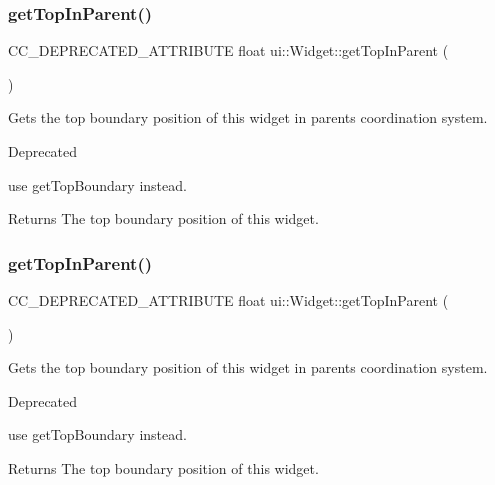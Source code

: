 \subsubsection{\texorpdfstring{get\+Top\+In\+Parent()}{getTopInParent()}\hspace{0.1cm}{\footnotesize\ttfamily [1/2]}}
{\footnotesize\ttfamily C\+C\+\_\+\+D\+E\+P\+R\+E\+C\+A\+T\+E\+D\+\_\+\+A\+T\+T\+R\+I\+B\+U\+TE float ui\+::\+Widget\+::get\+Top\+In\+Parent (\begin{DoxyParamCaption}{ }\end{DoxyParamCaption})\hspace{0.3cm}{\ttfamily [inline]}}

Gets the top boundary position of this widget in parent\textquotesingle{}s coordination system. \begin{DoxyRefDesc}{Deprecated}
\item[\hyperlink{deprecated__deprecated000171}{Deprecated}]use {\ttfamily get\+Top\+Boundary} instead. \end{DoxyRefDesc}
\begin{DoxyReturn}{Returns}
The top boundary position of this widget. 
\end{DoxyReturn}
\mbox{\label{classui_1_1Widget_a3a4efd935d1f5e58f1ee1d56dd493607}} 
\subsubsection{\texorpdfstring{get\+Top\+In\+Parent()}{getTopInParent()}\hspace{0.1cm}{\footnotesize\ttfamily [2/2]}}
{\footnotesize\ttfamily C\+C\+\_\+\+D\+E\+P\+R\+E\+C\+A\+T\+E\+D\+\_\+\+A\+T\+T\+R\+I\+B\+U\+TE float ui\+::\+Widget\+::get\+Top\+In\+Parent (\begin{DoxyParamCaption}{ }\end{DoxyParamCaption})\hspace{0.3cm}{\ttfamily [inline]}}

Gets the top boundary position of this widget in parent\textquotesingle{}s coordination system. \begin{DoxyRefDesc}{Deprecated}
\item[\hyperlink{deprecated__deprecated000406}{Deprecated}]use {\ttfamily get\+Top\+Boundary} instead. \end{DoxyRefDesc}
\begin{DoxyReturn}{Returns}
The top boundary position of this widget. 
\end{DoxyReturn}
\mbox{\label{classui_1_1Widget_ad89b2e8f90a0a28b840d40519b504685}} 
